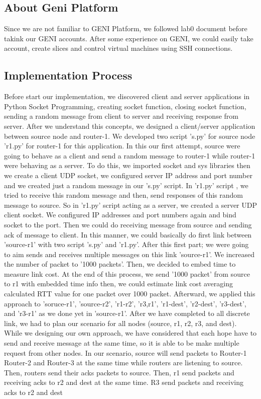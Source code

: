 \documentclass[letterpaper, 12 pt, conference]{ieeeconf}  %
\begin{document}
\subsection{About Geni Platform}
Since we are not familiar to GENI Platform, we followed lab0 document before takink our GENI accounts. After some experience on GENI, we could easily take account, create slices and control virtual machines using SSH connections.

\subsection{Implementation Process}
Before start our implementation, we discovered client and server applications in Python Socket Programming, creating socket function, closing socket function, sending a random message from client to server and receiving response from server. After we understand this concepts, we designed a client/server application between source node and router-1. We developed two script 's.py' for source node 'r1.py' for router-1 for this application. In this our first attempt, source were going to behave as a client and send a random message to router-1 while router-1 were behaving as a server. To do this, we imported socket and sys libraries then we create a client UDP socket, we configured server IP address and port number and we created just a random message in our 's.py' script. In 'r1.py' script , we tried to receive this random message and then, send responses of this random message to source. So in 'r1.py' script acting as a server, we created a server UDP client socket. We configured IP addresses and port numbers again and bind socket to the port. Then we could do receiving message from source and sending ack of message to client. In this manner, we could basically do first link between 'source-r1' with two script 's.py' and 'r1.py'. After this first part; we were going to aim sends and receives multiple messages on this link 'source-r1'. We increased the number of packet to '1000 packets'. Then, we decided to embed time to measure link cost. At the end of this process, we send '1000 packet' from source to r1 with embedded time info then, we could estimate link cost averaging calculated RTT value for one packet over 1000 packet. Afterward, we applied this approach to 'soruce-r1', 'source-r2', 'r1-r2', 'r3,r1', 'r1-dest', 'r2-dest', 'r3-dest', and 'r3-r1' as we done yet in 'source-r1'.  After we have completed to all discrete link, we had to plan our scenario for all nodes (source, r1, r2, r3, and dest). While we designing our own approach, we have considered that each hope have to send and receive message at the same time, so it is able to be make multiple request from other nodes. In our scenario, source will send packets to Router-1 Router-2 and Router-3 at the same time while routers are listening to source. Then, routers send their acks packets to source. Then, r1 send packets and receiving acks to r2 and dest at the same time. R3 send packets and receiving acks to r2 and dest 
\end{document}
